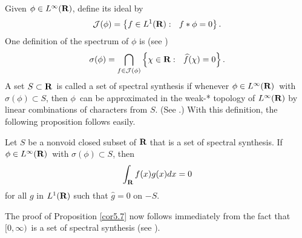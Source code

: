 Given $\phi\in L^\infty(\R)$, define its ideal by
$${\cal J}(\phi)=
  \left\{f\in L^1(\R):\ \ f * \phi = 0\right\}.$$
One definition of the spectrum of $\phi$ is (see \cite[Chapter 7, Theorem
7.8.2]{rudin})
\begin{equation}
\sigma(\phi) = \bigcap_{f\in {\cal J}(\phi)}
\left\{
\chi\in\R:\ \ \widehat{f}(\chi)=0
\right\}.
\label{spec}
\end{equation}
A set $S \subset \R$\ is called a set of spectral synthesis if whenever
$\phi \in L^\infty(\R)$\ with $\sigma(\phi) \subset S$, then $\phi$\
can be 
approximated in 
the weak-* topology of $L^\infty(\R)$ by linear 
combinations of characters from $S$.  
(See \cite[Section 7.8]{rudin}.)  With this definition,
the following proposition follows easily.
\begin{prop5.2}
Let $S$ be a nonvoid closed subset of $\R$ that is a set of spectral
synthesis.  If $\phi\in L^\infty(\R)$\ with $\sigma(\phi) \subset S$,
then
\[
\int_\R f(x)g(x)dx=0
\]
for all $g$ in $L^1(\R)$ such that $\widehat{g}= 0$ on $-S$.
\label{prop5.2}
\end{prop5.2}
The proof of Proposition \ref{cor5.7} now follows immediately from the
fact that $[0,\infty)$\ is a set of spectral synthesis 
(see \cite[Theorem 7.5.6]{rudin}).

